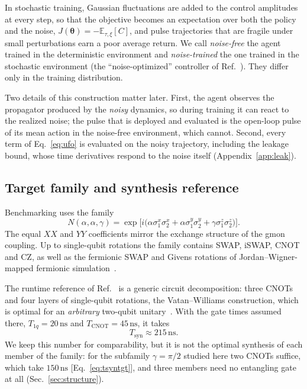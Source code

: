 \documentclass[aps,prx,twocolumn,superscriptaddress,nofootinbib,amsmath,amssymb,floatfix]{revtex4-2}
\newcommand{\Ntgt}[2]{N(#1,#1,#2)}
\newcommand{\Tsyn}{T_{\mathrm{syn}}}
\newcommand{\ns}{\,\mathrm{ns}}
\begin{document}
In stochastic training, Gaussian fluctuations are added to the control amplitudes at every step, so
that the objective becomes an expectation over both the policy and the noise,
$J(\bm\theta)=-\mathbb{E}_{\tau,\xi}[C]$, and pulse trajectories that are fragile under small
perturbations earn a poor average return. We call \emph{noise-free} the agent trained in the
deterministic environment and \emph{noise-trained} the one trained in the stochastic environment (the
``noise-optimized'' controller of Ref.~\cite{Niu2019}). They differ only in the training distribution.

Two details of this construction matter later. First, the agent observes the propagator produced by
the \emph{noisy} dynamics, so during training it can react to the realized noise; the pulse that is
deployed and evaluated is the open-loop pulse of its mean action in the noise-free environment, which
cannot. Second, every term of Eq.~\eqref{eq:ufo} is evaluated on the noisy trajectory, including the
leakage bound, whose time derivatives respond to the noise itself (Appendix~\ref{app:leak}).

\subsection{Target family and synthesis reference}
\label{sec:targets}

Benchmarking uses the family
\begin{equation}
\Ntgt{\alpha}{\gamma}=\exp\!\bigl[i\bigl(\alpha\sigma_1^x\sigma_2^x+\alpha\sigma_1^y\sigma_2^y+\gamma\sigma_1^z\sigma_2^z\bigr)\bigr].
\label{eq:family}
\end{equation}
The equal $XX$ and $YY$ coefficients mirror the exchange structure of the gmon coupling. Up to
single-qubit rotations the family contains SWAP, iSWAP, CNOT and CZ, as well as the fermionic SWAP and
Givens rotations of Jordan--Wigner-mapped fermionic simulation~\cite{Niu2019}.

The runtime reference of Ref.~\cite{Niu2019} is a generic circuit decomposition: three CNOTs and four
layers of single-qubit rotations, the Vatan--Williams construction, which is optimal for an
\emph{arbitrary} two-qubit unitary~\cite{VatanWilliams2004}. With the gate times assumed there,
$T_{1q}=20\ns$ and $T_{\mathrm{CNOT}}=45\ns$, it takes
\begin{equation}
\Tsyn\approx 215\ns .
\label{eq:tsyn}
\end{equation}
We keep this number for comparability, but it is not the optimal synthesis of each member of the family:
for the subfamily $\gamma=\pi/2$ studied here two CNOTs suffice, which take $150\ns$
[Eq.~\eqref{eq:tsyntgt}], and three members need no entangling gate at all (Sec.~\ref{sec:structure}).
\end{document}
